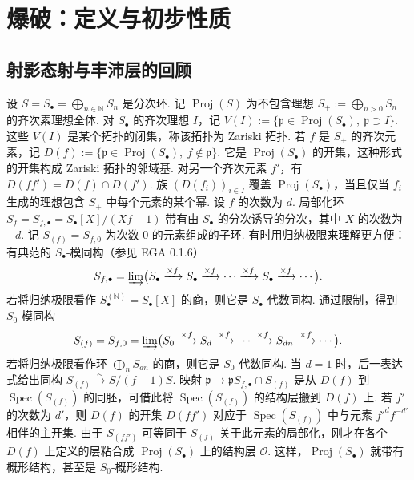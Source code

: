 \chapter{爆破：定义与初步性质}\label{chap:ag-2}
\section{射影态射与丰沛层的回顾}\label{sec:ag-2-1}
\begin{numpara}\label{item:ag-2-1-1}
设 $S=S_\bullet=\bigoplus_{n\in\mathbb N}S_n$ 是分次环. 记 $\operatorname{Proj}(S)$ 为不包含理想 $S_+:=\bigoplus_{n>0}S_n$ 的齐次素理想全体.
对 $S_\bullet$ 的齐次理想 $I$，记 $V(I):=\{\mathfrak p\in\operatorname{Proj}(S_\bullet),\ \mathfrak p\supset I\}$. 这些 $V(I)$ 是某个拓扑的闭集，称该拓扑为 Zariski 拓扑.
若 $f$ 是 $S_+$ 的齐次元素，记 $D(f):=\{\mathfrak p\in\operatorname{Proj}(S_\bullet),\ f\notin\mathfrak p\}$. 它是 $\operatorname{Proj}(S_\bullet)$ 的开集，这种形式的开集构成 Zariski 拓扑的邻域基. 对另一个齐次元素 $f'$，有 $D(ff')=D(f)\cap D(f')$. 族 $(D(f_i))_{i\in I}$ 覆盖 $\operatorname{Proj}(S_\bullet)$，当且仅当 $f_i$ 生成的理想包含 $S_+$ 中每个元素的某个幂.
设 $f$ 的次数为 $d$. 局部化环 $S_f=S_{f,\bullet}=S_\bullet[X]/(Xf-1)$ 带有由 $S_\bullet$ 的分次诱导的分次，其中 $X$ 的次数为 $-d$. 记 $S_{(f)}=S_{f,0}$ 为次数 $0$ 的元素组成的子环. 有时用归纳极限来理解更方便：有典范的 $S_\bullet$-模同构（参见 EGA 0.1.6）
\begin{align*}
S_{f,\bullet}=\varinjlim\bigl(S_\bullet\xrightarrow{\times f}S_\bullet\xrightarrow{\times f}\cdots\xrightarrow{\times f}S_\bullet\xrightarrow{\times f}\cdots\bigr).
\end{align*}
若将归纳极限看作 $S_\bullet^{(\mathbb N)}=S_\bullet[X]$ 的商，则它是 $S_\bullet$-代数同构. 通过限制，得到 $S_0$-模同构
\begin{align*}
S_{(f)}=S_{f,0}=\varinjlim\bigl(S_0\xrightarrow{\times f}S_d\xrightarrow{\times f}\cdots\xrightarrow{\times f}S_{dn}\xrightarrow{\times f}\cdots\bigr).
\end{align*}
若将归纳极限看作环 $\bigoplus_nS_{dn}$ 的商，则它是 $S_0$-代数同构. 当 $d=1$ 时，后一表达式给出同构 $S_{(f)}\xrightarrow\sim S/(f-1)S$.
映射 $\mathfrak p\mapsto\mathfrak pS_{f,\bullet}\cap S_{(f)}$ 是从 $D(f)$ 到 $\operatorname{Spec}(S_{(f)})$ 的同胚，可借此将 $\operatorname{Spec}(S_{(f)})$ 的结构层搬到 $D(f)$ 上. 若 $f'$ 的次数为 $d'$，则 $D(f)$ 的开集 $D(ff')$ 对应于 $\operatorname{Spec}(S_{(f)})$ 中与元素 $f'^df^{-d'}$ 相伴的主开集. 由于 $S_{(ff')}$ 可等同于 $S_{(f)}$ 关于此元素的局部化，刚才在各个 $D(f)$ 上定义的层粘合成 $\operatorname{Proj}(S_\bullet)$ 上的结构层 $\mathcal O$. 这样，$\operatorname{Proj}(S_\bullet)$ 就带有概形结构，甚至是 $S_0$-概形结构.

\end{numpara}
